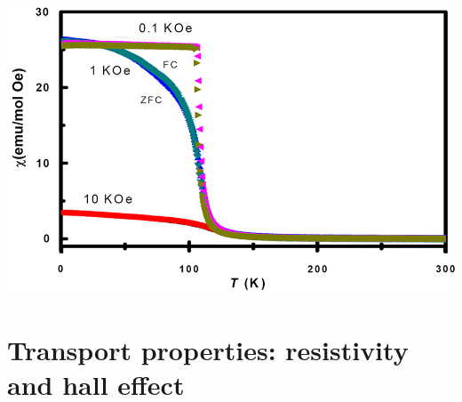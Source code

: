 \documentclass[preprint,pre,floats,aps,amsmath,amssymb]{revtex4}
\begin{document}
\begin{minipage}{.59\linewidth}
\includegraphics[width=1.1\linewidth]{suscvstemp.png}
\centering{}
\end{minipage}



\section{Transport properties: resistivity and hall effect}
\end{document}

